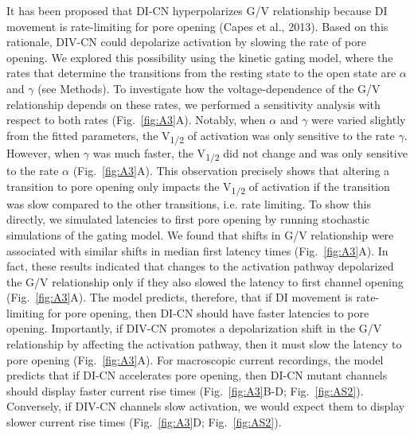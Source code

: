 It has been proposed that DI-CN hyperpolarizes G/V relationship because DI movement is rate-limiting for pore opening (Capes et al., 2013). Based on this rationale, DIV-CN could depolarize activation by slowing the rate of pore opening. We explored this possibility using the kinetic gating model, where the rates that determine the transitions from the resting state to the open state are $\alpha$ and $\gamma$ (see Methods). To investigate how the voltage-dependence of the G/V relationship depends on these rates, we performed a sensitivity analysis with respect to both rates (Fig.~\ref{fig:A3}A). Notably, when $\alpha$ and $\gamma$ were varied slightly from the fitted parameters, the V\textsubscript{1/2} of activation was only sensitive to the rate $\gamma$. However, when $\gamma$ was much faster, the V\textsubscript{1/2} did not change and was only sensitive to the rate $\alpha$ (Fig.~\ref{fig:A3}A). This observation precisely shows that altering a transition to pore opening only impacts the V\textsubscript{1/2} of activation if the transition was slow compared to the other transitions, i.e. rate limiting. To show this directly, we simulated latencies to first pore opening by running stochastic simulations of the gating model. We found that shifts in G/V relationship were associated with similar shifts in median first latency times (Fig.~\ref{fig:A3}A). In fact, these results indicated that changes to the activation pathway depolarized the G/V relationship only if they also slowed the latency to first channel opening (Fig.~\ref{fig:A3}A). The model predicts, therefore, that if DI movement is rate-limiting for pore opening, then DI-CN should have faster latencies to pore opening. Importantly, if DIV-CN promotes a depolarization shift in the G/V relationship by affecting the activation pathway, then it must slow the latency to pore opening (Fig.~\ref{fig:A3}A). For macroscopic current recordings, the model predicts that if DI-CN accelerates pore opening, then DI-CN mutant channels should display faster current rise times (Fig.~\ref{fig:A3}B-D; Fig.~\ref{fig:AS2}). Conversely, if DIV-CN channels slow activation, we would expect them to display slower current rise times (Fig.~\ref{fig:A3}D; Fig.~\ref{fig:AS2}).

